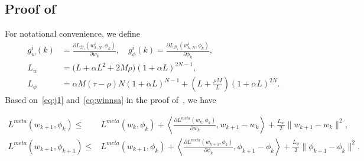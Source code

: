 \documentclass{osudissert96}
\begin{document}
\subsection*{Proof of }
For notational convenience, we define 
\begin{align}\label{eq:definitions}
g_{w}^i(k) &=  \frac{\partial L_{\mathcal{D}_i}( w^i_{k,N},\phi_k)}{\partial {w_k}},\quad g_{\phi}^i(k)  = \frac{\partial L_{\mathcal{D}_i}( w^i_{k,N},\phi_k)}{\partial {\phi_k}}, \nonumber
\\ L_w &=\big(L+\alpha L^2+2M\rho\big) (1+\alpha L)^{2N-1}, \nonumber
\\L_\phi & = \alpha M(\tau-\rho)  N(1+\alpha L)^{N-1} + \left(L+\frac{\rho M}{L}\right)(1+\alpha L)^{2N}.
\end{align}
Based on~\cref{eq:j1} and~\cref{eq:winnsa} in the proof of~, we have 
\begin{small}
\begin{align*}
L^{meta}(w_{k+1},\phi_k) \leq & L^{meta}(w_k,\phi_k) + \left\langle \frac{\partial L^{meta}(w_k,\phi_k)}{\partial w_k}, w_{k+1}-w_k  \right\rangle + \frac{L_w}{2} \|w_{k+1}-w_k\|^2, \nonumber
\\ L^{meta}(w_{k+1},\phi_{k+1}) \leq & L^{meta}(w_{k+1},\phi_k) + \left\langle \frac{\partial L^{meta}(w_{k+1},\phi_k)}{\partial \phi_k}, \phi_{k+1}-\phi_k  \right\rangle + \frac{L_\phi}{2} \|\phi_{k+1}-\phi_k\|^2.
\end{align*}
\end{small}
\end{document}
